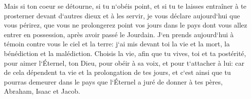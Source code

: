 \verse Mais si ton coeur se détourne, si tu n`obéis point, et si tu te laisses entraîner à te prosterner devant d`autres dieux et à les servir, 
\verse je vous déclare aujourd`hui que vous périrez, que vous ne prolongerez point vos jours dans le pays dont vous allez entrer en possession, après avoir passé le Jourdain. 
\verse J`en prends aujourd`hui à témoin contre vous le ciel et la terre: j`ai mis devant toi la vie et la mort, la bénédiction et la malédiction. Choisis la vie, afin que tu vives, toi et ta postérité, 
\verse pour aimer l`Éternel, ton Dieu, pour obéir à sa voix, et pour t`attacher à lui: car de cela dépendent ta vie et la prolongation de tes jours, et c`est ainsi que tu pourras demeurer dans le pays que l`Éternel a juré de donner à tes pères, Abraham, Isaac et Jacob. 

\chapter{}

